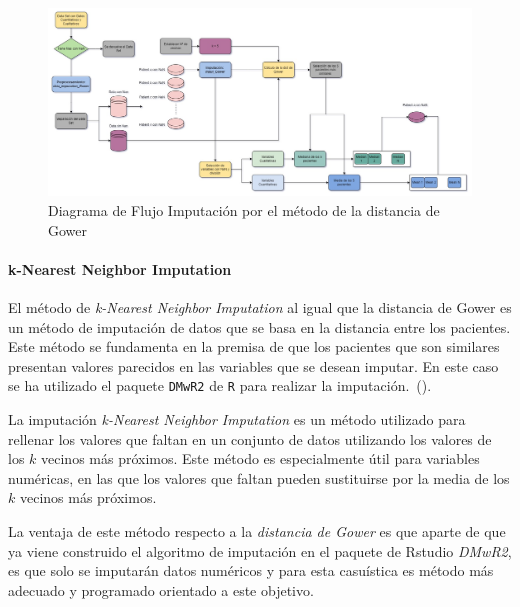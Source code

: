 \begin{landscape}
    \begin{figure}[H]
        \centering
        \includegraphics[scale = 0.5]{./img/gower-diagram.jpg}
        \caption{Diagrama de Flujo Imputación por el método de la distancia de Gower}
        \label{fig:gower-diagram}
    \end{figure}
\end{landscape}
\restoregeometry 



\paragraph{k-Nearest Neighbor Imputation}\label{sec:k_Nearest Neighbor_Imputation}

El método de \textit{k-Nearest Neighbor Imputation} al igual que la distancia de Gower es un método de imputación de datos que se basa en la distancia entre los pacientes. Este método se fundamenta en la premisa de que los pacientes que son similares presentan valores parecidos en las variables que se desean imputar. En este caso se ha utilizado el paquete \texttt{DMwR2} de \texttt{R} para realizar la imputación.~(\cite{DMwR2}).

La imputación \textit{k-Nearest Neighbor Imputation} es un método utilizado para rellenar los valores que faltan en un conjunto de datos utilizando los valores de los $k$ vecinos más próximos. Este método es especialmente útil para variables numéricas, en las que los valores que faltan pueden sustituirse por la media de los $k$ vecinos más próximos.

La ventaja de este método respecto a la \textit{distancia de Gower} es que aparte de que ya viene construido el algoritmo de imputación en el paquete de Rstudio \textit{DMwR2}, es que solo se imputarán datos numéricos y para esta casuística es método más adecuado y programado orientado a este objetivo.

